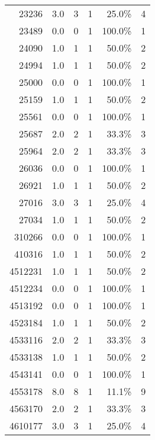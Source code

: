 \begin{longtable}{lrrrrr}
	\multicolumn{1}{r}{23236} & 3.0   & 3     & 1     & 25.0\% & 4 \\
	\multicolumn{1}{r}{23489} & 0.0   & 0     & 1     & 100.0\% & 1 \\
	\multicolumn{1}{r}{24090} & 1.0   & 1     & 1     & 50.0\% & 2 \\
	\multicolumn{1}{r}{24994} & 1.0   & 1     & 1     & 50.0\% & 2 \\
	\multicolumn{1}{r}{25000} & 0.0   & 0     & 1     & 100.0\% & 1 \\
	\multicolumn{1}{r}{25159} & 1.0   & 1     & 1     & 50.0\% & 2 \\
	\multicolumn{1}{r}{25561} & 0.0   & 0     & 1     & 100.0\% & 1 \\
	\multicolumn{1}{r}{25687} & 2.0   & 2     & 1     & 33.3\% & 3 \\
	\multicolumn{1}{r}{25964} & 2.0   & 2     & 1     & 33.3\% & 3 \\
	\multicolumn{1}{r}{26036} & 0.0   & 0     & 1     & 100.0\% & 1 \\
	\multicolumn{1}{r}{26921} & 1.0   & 1     & 1     & 50.0\% & 2 \\
	\multicolumn{1}{r}{27016} & 3.0   & 3     & 1     & 25.0\% & 4 \\
	\multicolumn{1}{r}{27034} & 1.0   & 1     & 1     & 50.0\% & 2 \\
	\multicolumn{1}{r}{310266} & 0.0   & 0     & 1     & 100.0\% & 1 \\
	\multicolumn{1}{r}{410316} & 1.0   & 1     & 1     & 50.0\% & 2 \\
	\multicolumn{1}{r}{4512231} & 1.0   & 1     & 1     & 50.0\% & 2 \\
	\multicolumn{1}{r}{4512234} & 0.0   & 0     & 1     & 100.0\% & 1 \\
	\multicolumn{1}{r}{4513192} & 0.0   & 0     & 1     & 100.0\% & 1 \\
	\multicolumn{1}{r}{4523184} & 1.0   & 1     & 1     & 50.0\% & 2 \\
	\multicolumn{1}{r}{4533116} & 2.0   & 2     & 1     & 33.3\% & 3 \\
	\multicolumn{1}{r}{4533138} & 1.0   & 1     & 1     & 50.0\% & 2 \\
	\multicolumn{1}{r}{4543141} & 0.0   & 0     & 1     & 100.0\% & 1 \\
	\multicolumn{1}{r}{4553178} & 8.0   & 8     & 1     & 11.1\% & 9 \\
	\multicolumn{1}{r}{4563170} & 2.0   & 2     & 1     & 33.3\% & 3 \\
	\multicolumn{1}{r}{4610177} & 3.0   & 3     & 1     & 25.0\% & 4 \\

\end{longtable}
